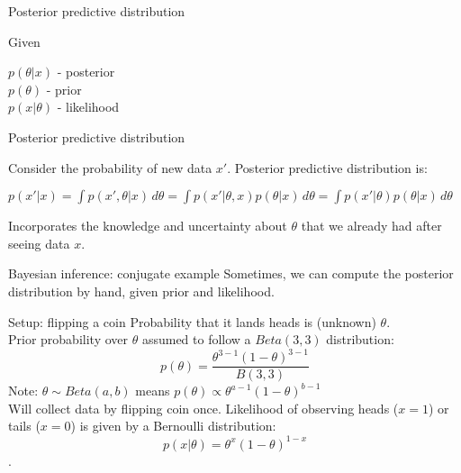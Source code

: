 \documentclass[10pt]{beamer}
\begin{document}
\begin{frame}{Posterior predictive distribution}

\begin{sblock}{Given}

$p(\theta | x)$ - posterior \\
$p(\theta)$ - prior \\
$p(x | \theta)$ - likelihood

\end{sblock}

\begin{sblock}{Posterior predictive distribution}

Consider the probability of new data $x'$. Posterior predictive distribution is:

$p(x' | x) = \int p(x', \theta | x) \, d\theta = \int p(x' | \theta, x) p(\theta |x) \, d\theta = \int p(x' | \theta) p(\theta | x) \, d\theta$

Incorporates the knowledge and uncertainty about $\theta$ that we already had after seeing data $x$.

\end{sblock}

\end{frame}



\begin{frame}{Bayesian inference: conjugate example}
Sometimes, we can compute the posterior distribution by hand, given prior and likelihood.

\begin{sblock}{Setup: flipping a coin}
Probability that it lands heads is (unknown) $\theta$. \\
Prior probability over $\theta$ assumed to follow a $Beta(3,3)$ distribution:
$$ p(\theta) = \frac{\theta^{3-1}(1-\theta)^{3-1}}{B(3,3)}$$
Note: $\theta \sim Beta(a, b)$ means $p(\theta) \propto \theta^{a-1}(1-\theta)^{b-1}$\\
Will collect data by flipping coin once. Likelihood of observing heads ($x=1$) or tails ($x=0$) is given by a Bernoulli distribution:
$$p(x | \theta) = \theta^x(1-\theta)^{1-x} $$.
\end{sblock}


\end{frame}
\end{document}
